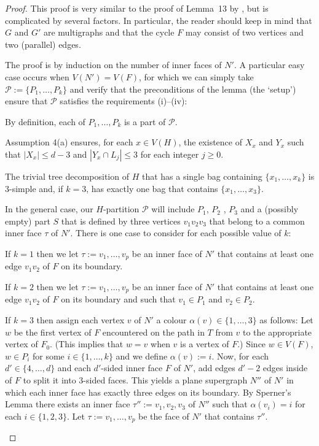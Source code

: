 \documentclass{patmorin}
\theoremstyle{plain}
\theoremstyle{definition}
\newcommand{\PP}{\mathcal{P}}
\renewcommand{\ge}{\geqslant}
\renewcommand{\le}{\leqslant}
\begin{document}
\begin{proof}
	This proof is very similar to the proof of Lemma~13 by \citet{DJMMUW20}, but is complicated by several factors.  In particular, the reader should keep in mind that $G$ and $G'$ are multigraphs and that the cycle $F$ may consist of two vertices and two (parallel) edges.

	The proof is by induction on the number of inner faces of $N'$.  A particular easy case occurs when $V(N')=V(F)$, for which we can simply take $\PP:=\{P_1,\ldots,P_k\}$ and verify that the preconditions of the lemma (the `setup') ensure that $\PP$ satisfies the requirements (i)--(iv):
	\begin{compactenum}[(i)]
		\item By definition, each of $P_1,\ldots,P_k$ is a part of $\mathcal{P}$.
		\item Assumption 4(a) ensures, for each $x\in V(H)$, the existence of $X_x$ and $Y_x$ such that $|X_x|\le d-3$ and $|Y_x\cap L_j|\le 3$ for each integer $j\ge 0$.
		\item The trivial tree decomposition of $H$ that has a single bag containing $\{x_1,\ldots,x_k\}$ is $3$-simple and, if $k=3$, has exactly one bag that contains $\{x_1,\ldots,x_3\}$.
	\end{compactenum}

	In the general case, our $H$-partition $\mathcal{P}$ will include $P_1$, $P_2$ , $P_3$ and a (possibly empty) part $S$ that is defined by three vertices $v_1v_2v_3$ that belong to a common inner face $\tau$ of $N'$.  There is one case to consider for each possible value of $k$:
	\begin{compactenum}
		\item If $k=1$ then we let $\tau:=v_1,\ldots,v_p$ be an inner face of $N'$ that contains at least one edge $v_1v_2$ of $F$ on its boundary.

		\item If $k= 2$ then we let $\tau:=v_1,\ldots,v_p$ be an inner face of $N'$ that contains at least one edge $v_1v_2$ of $F$ on its boundary and such that $v_1\in P_1$ and $v_2\in P_2$.

		\item If $k=3$ then assign each vertex $v$ of $N'$ a colour $\alpha(v)\in\{1,\ldots,3\}$ as follows:  Let $w$ be the first vertex of $F$ encountered on the path in $T$ from $v$ to the appropriate vertex of $F_0$.  (This implies that $w=v$ when $v$ is a vertex of $F$.)  Since $w\in V(F)$, $w\in P_i$ for some $i\in\{1,\ldots,k\}$ and we define $\alpha(v):=i$.  Now, for each $d'\in\{4,\ldots,d\}$ and each $d'$-sided inner face $F$ of $N'$, add edges $d'-2$ edges inside of $F$ to split it into $3$-sided faces.  This yields a plane supergraph $N''$ of $N'$ in which each inner face has exactly three edges on its boundary. By Sperner's Lemma there exists an inner face $\tau'':=v_1,v_2,v_3$ of $N''$ such that $\alpha(v_i)=i$ for each $i\in\{1,2,3\}$.  Let $\tau:=v_1,\ldots,v_p$ be the face of $N'$ that contains $\tau''$.  %
	\end{compactenum}


\end{proof}
\end{document}
